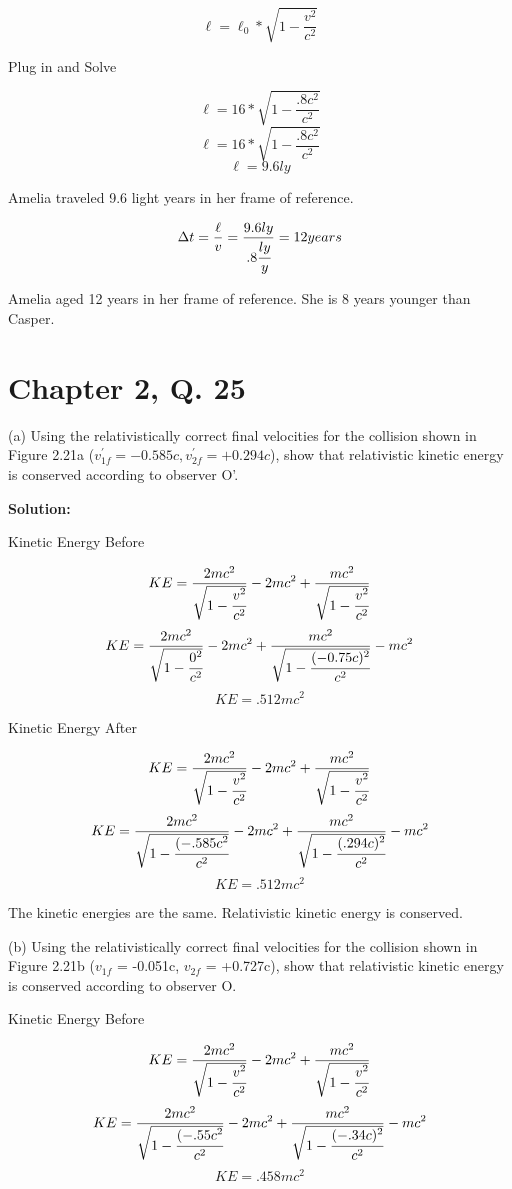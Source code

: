 \documentclass{article}
\begin{document}
$$ \ell = \ell_0 * \sqrt{1 - \frac{v^2}{c^2}} $$

Plug in and Solve

$$ \ell = 16 * \sqrt{1 - \frac{.8c^2}{c^2}} $$
$$ \ell = 16 * \sqrt{1 - \frac{.8c^2}{c^2}} $$
$$ \ell = 9.6 ly $$

Amelia traveled 9.6 light years in her frame of reference.

$$\Delta t = \frac{\ell}{v} = \frac{9.6ly}{.8 \cfrac{ly}{y}} = 12 years $$

Amelia aged 12 years in her frame of reference. She is 8 years younger than Casper.

\section*{Chapter 2, Q. 25}
(a) Using the relativistically correct final velocities for the collision shown in Figure 2.21a ($v^{'}_{1f} = -0.585c, v^{'}_{2f}=+0.294c$), show that relativistic kinetic energy is conserved according to observer O'.

\textbf{Solution:}

Kinetic Energy Before

$$ KE = \frac{2mc^2}{\sqrt{1 - \cfrac{v^2}{c^2}}} - 2mc^2 + \frac{mc^2}{\sqrt{1 - \cfrac{v^2}{c^2}}}$$
$$ KE = \frac{2mc^2}{\sqrt{1 - \cfrac{0^2}{c^2}}} - 2mc^2 + \frac{mc^2}{\sqrt{1 - \cfrac{(-0.75c)^2}{c^2}}} - mc^2$$
$$ KE =  .512 mc^2 $$

Kinetic Energy After

$$ KE = \frac{2mc^2}{\sqrt{1 - \cfrac{v^2}{c^2}}} - 2mc^2 + \frac{mc^2}{\sqrt{1 - \cfrac{v^2}{c^2}}}$$
$$ KE = \frac{2mc^2}{\sqrt{1 - \cfrac{(-.585c^2}{c^2}}} - 2mc^2 + \frac{mc^2}{\sqrt{1 - \cfrac{(.294c)^2}{c^2}}} - mc^2$$
$$ KE =  .512 mc^2 $$

The kinetic energies are the same. Relativistic kinetic energy is conserved.



(b) Using the relativistically correct final velocities for the collision shown in Figure 2.21b ($v_{1f}$ = -0.051c, $v_{2f}$ = +0.727c), show that relativistic kinetic energy is conserved according to observer O.

Kinetic Energy Before

$$ KE = \frac{2mc^2}{\sqrt{1 - \cfrac{v^2}{c^2}}} - 2mc^2 + \frac{mc^2}{\sqrt{1 - \cfrac{v^2}{c^2}}}$$
$$ KE = \frac{2mc^2}{\sqrt{1 - \cfrac{(-.55c^2}{c^2}}} - 2mc^2 + \frac{mc^2}{\sqrt{1 - \cfrac{(-.34c)^2}{c^2}}} - mc^2$$
$$ KE =  .458 mc^2 $$
\end{document}
